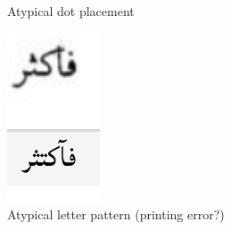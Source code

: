 \begin{figure}[!ht]
\begin{subfigure}[b]{0.3\linewidth}
	\caption{Atypical dot placement}
	\label{fig3:fig12}
	\end{subfigure}
	\begin{subfigure}[b]{0.3\linewidth}
	\centering
	\includegraphics[width=\linewidth]{images/image24.png}
	\caption{Atypical letter pattern (printing error?)}
	\label{fig3:fig13}
	\end{subfigure}
	\begin{subfigure}[b]{0.3\linewidth}

\end{subfigure}
\end{figure}
